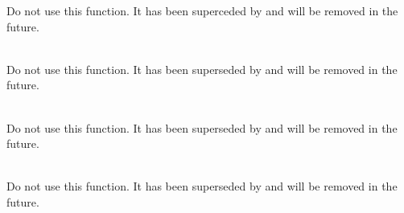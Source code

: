 \begin{DoxyRefList}
\label{deprecated__deprecated000672}%
%
Do not use this function. It has been superceded by  and will be removed in the future.  
\item[Global \doxylink{group___complex_f_f_t_ga0c2acfda3126c452e75b81669e8ad9ef}{arm\+\_\+cfft\+\_\+radix4\+\_\+init\+\_\+q15} (\doxylink{structarm__cfft__radix4__instance__q15}{arm\+\_\+cfft\+\_\+radix4\+\_\+instance\+\_\+q15} \texorpdfstring{$\ast$}{*}S, uint16\+\_\+t fft\+Len, uint8\+\_\+t ifft\+Flag, uint8\+\_\+t bit\+Reverse\+Flag)]\hfill \\
\label{deprecated__deprecated000673}%
%
Do not use this function. It has been superseded by  and will be removed in the future.  
\item[Global \doxylink{group___complex_f_f_t_gad5caaafeec900c8ff72321c01bbd462c}{arm\+\_\+cfft\+\_\+radix4\+\_\+init\+\_\+q31} (\doxylink{structarm__cfft__radix4__instance__q31}{arm\+\_\+cfft\+\_\+radix4\+\_\+instance\+\_\+q31} \texorpdfstring{$\ast$}{*}S, uint16\+\_\+t fft\+Len, uint8\+\_\+t ifft\+Flag, uint8\+\_\+t bit\+Reverse\+Flag)]\hfill \\
\label{deprecated__deprecated000674}%
%
Do not use this function. It has been superseded by  and will be removed in the future.  
\item[Global \doxylink{group___complex_f_f_t_ga8d66cdac41b8bf6cefdb895456eee84a}{arm\+\_\+cfft\+\_\+radix4\+\_\+q15} (const \doxylink{structarm__cfft__radix4__instance__q15}{arm\+\_\+cfft\+\_\+radix4\+\_\+instance\+\_\+q15} \texorpdfstring{$\ast$}{*}S, \doxylink{arm__math__types_8h_ab5a8fb21a5b3b983d5f54f31614052ea}{q15\+\_\+t} \texorpdfstring{$\ast$}{*}p\+Src)]\hfill \\
\label{deprecated__deprecated000675}%
%
Do not use this function. It has been superseded by  and will be removed in the future.  
\item[Global \doxylink{group___complex_f_f_t_gafde3ee1f58cf393b45a9073174fff548}{arm\+\_\+cfft\+\_\+radix4\+\_\+q31} (const \doxylink{structarm__cfft__radix4__instance__q31}{arm\+\_\+cfft\+\_\+radix4\+\_\+instance\+\_\+q31} \texorpdfstring{$\ast$}{*}S, \doxylink{arm__math__types_8h_adc89a3547f5324b7b3b95adec3806bc0}{q31\+\_\+t} \texorpdfstring{$\ast$}{*}p\+Src)]\hfill \\

\end{DoxyRefList}
